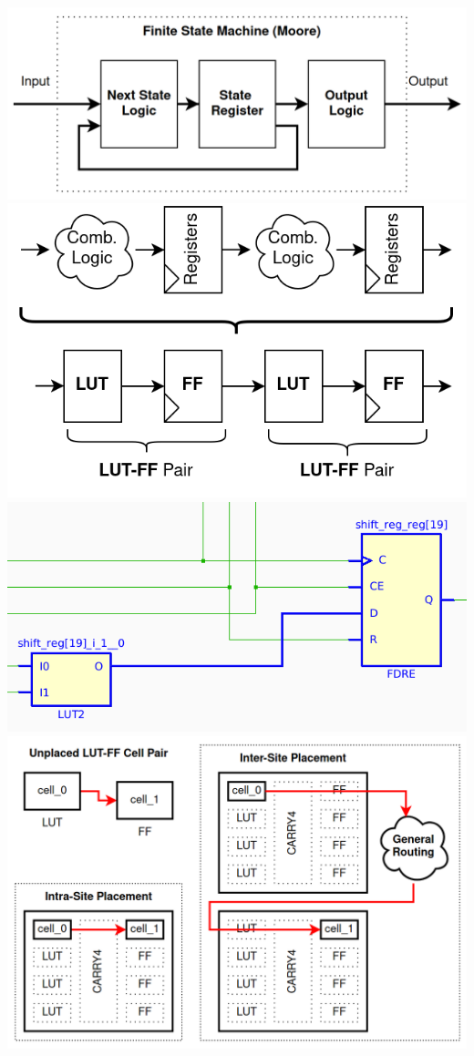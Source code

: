 \begin{multicols}{2}
{
    \centering
    \includegraphics[width=\columnwidth]{figures/fsm.png}
    \label{fig:fsm}
}
{
    \centering
    \includegraphics[width=0.9\columnwidth]{figures/pipelining.png}
    \label{fig:pipelining}
}
{
    \centering
    \includegraphics[width=0.9\columnwidth]{figures/lut_ff_pair.png}
    \label{fig:lut_ff_pair}
}
{
    \centering
    \includegraphics[width=\columnwidth]{figures/intersite_intrasite_2.png}
}
\end{multicols}
